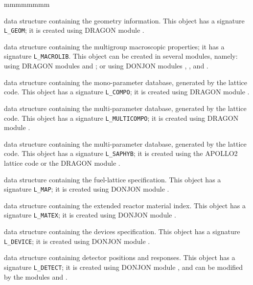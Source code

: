 \vskip 0.2cm
\begin{ListeDeDescription}{mmmmmmmm}

\item[\dds{geometry}] data structure containing the geometry information.
This object has a signature {\tt L\_GEOM}; it is created using DRAGON
module .

\item[\dds{macrolib}] data structure containing the multigroup macroscopic
properties; it has a signature {\tt L\_MACROLIB}. This object can be
created in several modules, namely: using DRAGON modules 
and ; or using DONJON modules , ,
and .

\item[\dds{compo}] data structure containing the mono-parameter
database, generated by the lattice code.
This object has a signature {\tt L\_COMPO}; it is created using DRAGON
module .

\item[\dds{multicompo}] data structure containing the multi-parameter
database, generated by the lattice code.
This object has a signature {\tt L\_MULTICOMPO}; it is created using
DRAGON module .

\item[\dds{saphyb}] data structure containing the multi-parameter
database, generated by the lattice code.
This object has a signature {\tt L\_SAPHYB}; it is created using
the APOLLO2 lattice code or the DRAGON module .

\item[\dds{fmap}] data structure containing the fuel-lattice
specification. This object has a signature {\tt L\_MAP}; it is created
using DONJON module .

\item[\dds{matex}] data structure containing the extended reactor
material index. This object has a signature {\tt L\_MATEX}; it is created
using DONJON module .

\item[\dds{device}] data structure containing the devices specification.
This object has a signature {\tt L\_DEVICE}; it is created using DONJON
module .

\item[\dds{detect}] data structure containing detector positions and responses.
This object has a signature {\tt L\_DETECT}; it is created using DONJON
module , and can be modified by the modules
 and  .


\end{ListeDeDescription}
